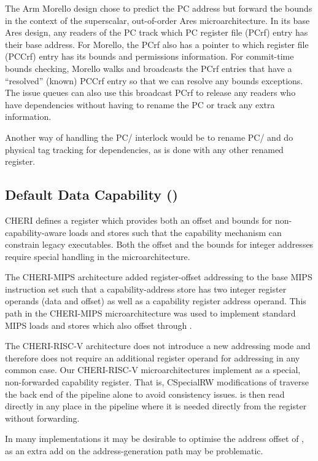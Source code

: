 The Arm Morello design chose to predict the PC address but forward the bounds in the context of the superscalar, out-of-order Ares microarchitecture.
In its base Ares design, any readers of the PC track which PC register file (PCrf) entry has their base address.
For Morello, the PCrf also has a pointer to which \PCC{} register file (PCCrf) entry has its bounds and permissions information.
For commit-time bounds checking, Morello walks and broadcasts the PCrf entries that have a “resolved” (known) PCCrf entry so that we can resolve any \PCC{} bounds exceptions.
The issue queues can also use this broadcast PCrf to release any \PCC{} readers who have dependencies without having to rename the PC or track any extra information.

Another way of handling the PC/\PCC{} interlock would be to rename PC/\PCC{} and do physical tag tracking for dependencies, as is done with any other renamed register.

\subsection{Default Data Capability (\DDC{})}
CHERI defines a \DDC{} register which provides both an offset and bounds for non-capability-aware loads and stores such that the capability mechanism can constrain legacy executables.
Both the offset and the bounds for integer addresses require special handling in the microarchitecture.

The CHERI-MIPS architecture added register-offset addressing to the base MIPS instruction set such that a capability-address store has two integer register operands (data and offset) as well as a capability register address operand.
This path in the CHERI-MIPS microarchitecture was used to implement standard MIPS loads and stores which also offset through \DDC{}.

The CHERI-RISC-V architecture does not introduce a new addressing mode and therefore does not require an additional register operand for addressing in any common case.
Our CHERI-RISC-V microarchitectures implement \DDC{} as a special, non-forwarded capability register.
That is, CSpecialRW modifications of \DDC{} traverse the back end of the pipeline alone to avoid consistency issues.
\DDC{} is then read directly in any place in the pipeline where it is needed directly from the register without forwarding.

In many implementations it may be desirable to optimise the address offset of \DDC{}, as an extra add on the address-generation path may be problematic.

